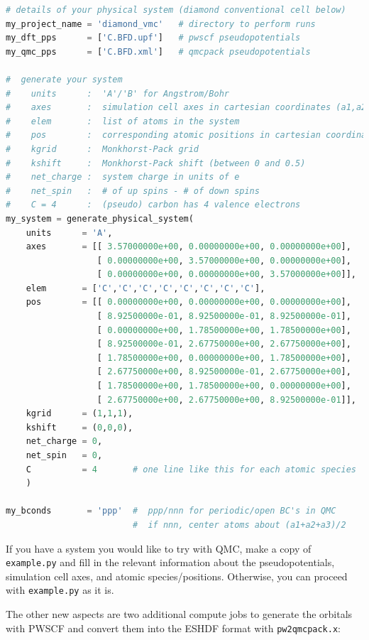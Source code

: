 \begin{lstlisting}[language=Python]
# details of your physical system (diamond conventional cell below)
my_project_name = 'diamond_vmc'   # directory to perform runs
my_dft_pps      = ['C.BFD.upf']   # pwscf pseudopotentials
my_qmc_pps      = ['C.BFD.xml']   # qmcpack pseudopotentials

#  generate your system
#    units      :  'A'/'B' for Angstrom/Bohr
#    axes       :  simulation cell axes in cartesian coordinates (a1,a2,a3)
#    elem       :  list of atoms in the system
#    pos        :  corresponding atomic positions in cartesian coordinates
#    kgrid      :  Monkhorst-Pack grid
#    kshift     :  Monkhorst-Pack shift (between 0 and 0.5)
#    net_charge :  system charge in units of e
#    net_spin   :  # of up spins - # of down spins
#    C = 4      :  (pseudo) carbon has 4 valence electrons
my_system = generate_physical_system(
    units      = 'A',
    axes       = [[ 3.57000000e+00, 0.00000000e+00, 0.00000000e+00],
                  [ 0.00000000e+00, 3.57000000e+00, 0.00000000e+00],
                  [ 0.00000000e+00, 0.00000000e+00, 3.57000000e+00]],
    elem       = ['C','C','C','C','C','C','C','C'],
    pos        = [[ 0.00000000e+00, 0.00000000e+00, 0.00000000e+00],
                  [ 8.92500000e-01, 8.92500000e-01, 8.92500000e-01],
                  [ 0.00000000e+00, 1.78500000e+00, 1.78500000e+00],
                  [ 8.92500000e-01, 2.67750000e+00, 2.67750000e+00],
                  [ 1.78500000e+00, 0.00000000e+00, 1.78500000e+00],
                  [ 2.67750000e+00, 8.92500000e-01, 2.67750000e+00],
                  [ 1.78500000e+00, 1.78500000e+00, 0.00000000e+00],
                  [ 2.67750000e+00, 2.67750000e+00, 8.92500000e-01]],
    kgrid      = (1,1,1),
    kshift     = (0,0,0),
    net_charge = 0,
    net_spin   = 0,
    C          = 4       # one line like this for each atomic species
    )

my_bconds       = 'ppp'  #  ppp/nnn for periodic/open BC's in QMC
                         #  if nnn, center atoms about (a1+a2+a3)/2
\end{lstlisting}

If you have a system you would like to try with QMC, make a copy of \texttt{example.py} and fill in the relevant information about the pseudopotentials, simulation cell axes, and atomic species/positions.  Otherwise, you can proceed with \texttt{example.py} as it is.

The other new aspects are two additional compute jobs to generate the orbitals with PWSCF and convert them into the ESHDF format with \texttt{pw2qmcpack.x}:


